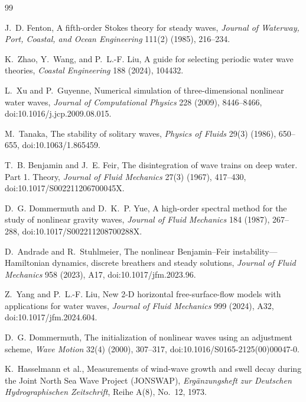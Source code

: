 \documentclass[10pt]{article}
\begin{document}
{\footnotesize
\begin{thebibliography}{99}
\setlength{\itemsep}{0pt}

J.~D. Fenton,
\newblock A fifth-order Stokes theory for steady waves,
\newblock \emph{Journal of Waterway, Port, Coastal, and Ocean Engineering}
111(2) (1985), 216--234.

K.~Zhao, Y.~Wang, and P.~L.-F. Liu,
\newblock A guide for selecting periodic water wave theories,
\newblock \emph{Coastal Engineering} 188 (2024), 104432.

L.~Xu and P.~Guyenne,
\newblock Numerical simulation of three-dimensional nonlinear water waves,
\newblock \emph{Journal of Computational Physics} 228 (2009), 8446--8466,
\newblock doi:10.1016/j.jcp.2009.08.015.

M.~Tanaka,
\newblock The stability of solitary waves,
\newblock \emph{Physics of Fluids} 29(3) (1986), 650--655,
\newblock doi:10.1063/1.865459.

T.~B. Benjamin and J.~E. Feir,
\newblock The disintegration of wave trains on deep water. Part 1. Theory,
\newblock \emph{Journal of Fluid Mechanics} 27(3) (1967), 417--430,
\newblock doi:10.1017/S002211206700045X.

D.~G. Dommermuth and D.~K.~P. Yue,
\newblock A high-order spectral method for the study of nonlinear gravity
waves,
\newblock \emph{Journal of Fluid Mechanics} 184 (1987), 267--288,
\newblock doi:10.1017/S002211208700288X.

D.~Andrade and R.~Stuhlmeier,
\newblock The nonlinear Benjamin--Feir instability---Hamiltonian dynamics,
discrete breathers and steady solutions,
\newblock \emph{Journal of Fluid Mechanics} 958 (2023), A17,
\newblock doi:10.1017/jfm.2023.96.

Z.~Yang and P.~L.-F. Liu,
\newblock New 2-D horizontal free-surface-flow models with applications for
water waves,
\newblock \emph{Journal of Fluid Mechanics} 999 (2024), A32,
\newblock doi:10.1017/jfm.2024.604.

D.~G. Dommermuth,
\newblock The initialization of nonlinear waves using an adjustment scheme,
\newblock \emph{Wave Motion} 32(4) (2000), 307--317,
\newblock doi:10.1016/S0165-2125(00)00047-0.

K.~Hasselmann et al.,
\newblock Measurements of wind-wave growth and swell decay during the Joint
North Sea Wave Project (JONSWAP),
\newblock \emph{Erg\"anzungsheft zur Deutschen Hydrographischen Zeitschrift},
Reihe A(8), No.~12, 1973.


\end{thebibliography}}
\end{document}
